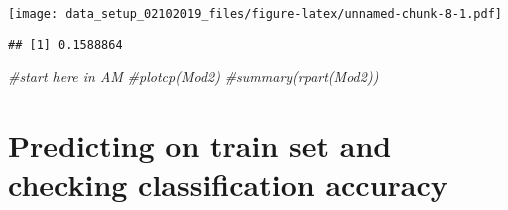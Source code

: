 \documentclass[]{article}
\newenvironment{Shaded}{\begin{snugshade}}{\end{snugshade}}
\newcommand{\KeywordTok}[1]{\textcolor[rgb]{0.13,0.29,0.53}{\textbf{{#1}}}}
\newcommand{\DataTypeTok}[1]{\textcolor[rgb]{0.13,0.29,0.53}{{#1}}}
\newcommand{\StringTok}[1]{\textcolor[rgb]{0.31,0.60,0.02}{{#1}}}
\newcommand{\CommentTok}[1]{\textcolor[rgb]{0.56,0.35,0.01}{\textit{{#1}}}}
\newcommand{\NormalTok}[1]{{#1}}
\begin{document}
\texttt{[image: data\_setup\_02102019\_files/figure-latex/unnamed-chunk-8-1.pdf]}

\begin{Shaded}
\end{Shaded}

\begin{verbatim}
## [1] 0.1588864
\end{verbatim}

\begin{Shaded}
\begin{Highlighting}[]
\CommentTok{#start here in AM}
\CommentTok{#plotcp(Mod2)}
\CommentTok{#summary(rpart(Mod2))}
\end{Highlighting}
\end{Shaded}

\section{Predicting on train set and checking classification
accuracy}\label{predicting-on-train-set-and-checking-classification-accuracy}

\begin{Shaded}
\end{Shaded}
\end{document}
